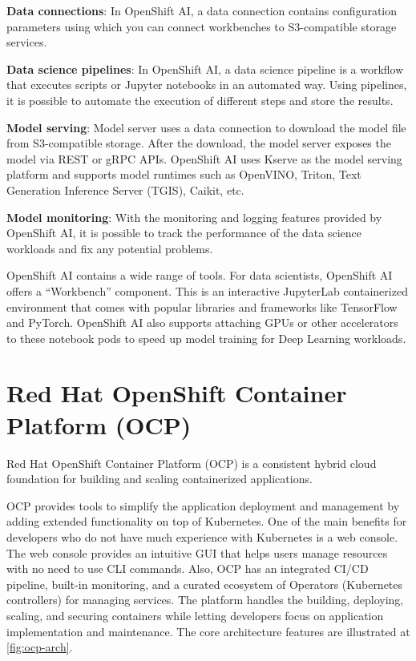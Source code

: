 \textbf{Data connections}:
In OpenShift AI, a data connection contains configuration parameters using which you can connect workbenches to S3-compatible storage services.

\medskip

\textbf{Data science pipelines}:
In OpenShift AI, a data science pipeline is a workflow that executes scripts or Jupyter notebooks in an automated way. Using pipelines, it is possible to automate the execution of different steps and store the results.

\medskip

\textbf{Model serving}:
Model server uses a data connection to download the model file from S3-compatible storage. After the download, the model server exposes the model via REST or gRPC APIs. OpenShift AI uses Kserve as the model serving platform and supports model runtimes such as OpenVINO, Triton, Text Generation Inference Server (TGIS), Caikit, etc.

\medskip

\textbf{Model monitoring}:
With the monitoring and logging features provided by OpenShift AI, it is possible to track the performance of the data science workloads and fix any potential problems. 

\medskip

OpenShift AI contains a wide range of tools. For data scientists, OpenShift AI offers a \enquote{Workbench} component. This is an interactive JupyterLab containerized environment that comes with popular libraries and frameworks like TensorFlow and PyTorch. OpenShift AI also supports attaching GPUs or other accelerators to these notebook pods to speed up model training for Deep Learning workloads.

\section*{Red Hat OpenShift Container Platform (OCP)}

Red Hat OpenShift Container Platform (OCP) is a consistent hybrid cloud foundation for building and scaling containerized applications.

OCP provides tools to simplify the application deployment and management by adding extended functionality on top of Kubernetes. One of the main benefits for developers who do not have much experience with Kubernetes is a web console. The web console provides an intuitive GUI that helps users manage resources with no need to use CLI commands. Also, OCP has an integrated CI/CD pipeline, built-in monitoring, and a curated ecosystem of Operators (Kubernetes controllers) for managing services. The platform handles the building, deploying, scaling, and securing containers while letting developers focus on application implementation and maintenance. The core architecture features are illustrated at \autoref{fig:ocp-arch}.

